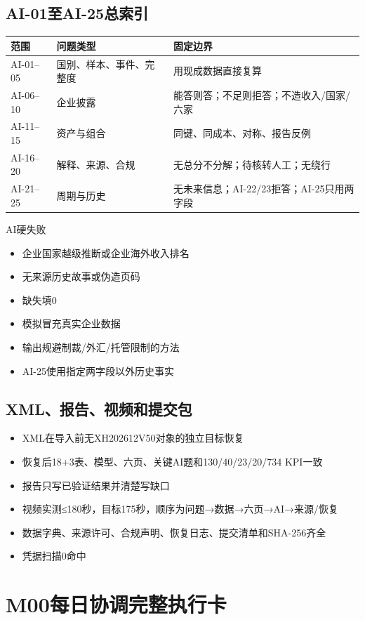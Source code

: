\documentclass[UTF8,openany,zihao=-4]{ctexbook}
\renewcommand{\_}{\textunderscore\allowbreak}
\begin{document}
\section{AI-01至AI-25总索引}
\noindent\begin{tabularx}{\textwidth}{@{}p{}p{}X@{}}
\toprule
\textbf{范围} & \textbf{问题类型} & \textbf{固定边界} \\
\midrule
AI-01--05 & 国别、样本、事件、完整度 & 用现成数据直接复算 \\
AI-06--10 & 企业披露 & 能答则答；不足则拒答；不造收入/国家/六家 \\
AI-11--15 & 资产与组合 & 同键、同成本、对称、报告反例 \\
AI-16--20 & 解释、来源、合规 & 无总分不分解；待核转人工；无绕行 \\
AI-21--25 & 周期与历史 & 无未来信息；AI-22/23拒答；AI-25只用两字段 \\
\bottomrule
\end{tabularx}
\begin{dangerbox}{AI硬失败}
\begin{itemize}
\item 企业国家越级推断或企业海外收入排名
\item 无来源历史故事或伪造页码
\item 缺失填0
\item 模拟冒充真实企业数据
\item 输出规避制裁/外汇/托管限制的方法
\item AI-25使用指定两字段以外历史事实
\end{itemize}
\end{dangerbox}
\section{XML、报告、视频和提交包}
\begin{itemize}[label=$\square$]
\item XML在导入前无XH202612\_V50对象的独立目标恢复
\item 恢复后18+3表、模型、六页、关键AI题和130/40/23/20/734 KPI一致
\item 报告只写已验证结果并清楚写缺口
\item 视频实测≤180秒，目标175秒，顺序为问题→数据→六页→AI→来源/恢复
\item 数据字典、来源许可、合规声明、恢复日志、提交清单和SHA-256齐全
\item 凭据扫描0命中
\end{itemize}
\chapter{M00每日协调完整执行卡}
\end{document}
